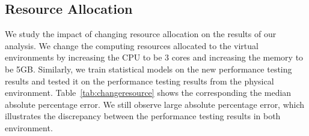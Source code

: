 
\begin{comment}
\begin{table}[tbh]
	\centering
	\caption{Discrepancy vs. Change in Virtual Environment}
	\label{my-label}
	\resizebox{\columnwidth}{!}{%
		\begin{tabular}{|c||c|c|}
			\hline
			\multirow{2}{*}{\textbf{Type}} & \multicolumn{2}{c|}{\textbf{MAPE}} \\ \cline{2-3} 
			& \textbf{CloudStore} & \textbf{DS2} \\ %
			\midrule
			\midrule
			Internal validation & 3.65\% & 10.52\% \\ \hline
			External validation with virtual repeated test \# 1 & 6.04\% & 11.69\% \\ \hline
			External validation with virtual repeated test \# 2 & 5.43\% & 15.48\% \\ \hline
			VMWare & 10.18\% & 12.89\% \\ \hline
			Change in resources & 25.81\% & 84.36\% \\ \hline
		\end{tabular}%
	}
\end{table}
\end{comment}


\subsection{Resource Allocation}
We study the impact of changing resource allocation on the results of our analysis. We change the computing resources allocated to the virtual environments by increasing the CPU to be 3 cores and increasing the memory to be 5GB. Similarly, we train statistical models on the new performance testing results and tested it on the performance testing results from the physical environment. Table~\ref{tab:changeresource} shows the corresponding the median absolute percentage error. We still observe large absolute percentage error, which illustrates the discrepancy between the performance testing results in both environment. 

